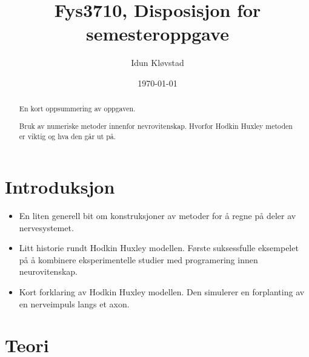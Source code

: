 \documentclass[a4paper,norsk,12pt,oneside]{article}
\title{Fys3710, Disposisjon for semesteroppgave}
\author{Idun Kløvstad}
\date{\today}
\begin{document}
\maketitle
\newpage 

\begin{abstract}
    En kort oppsummering av oppgaven. 

    Bruk av numeriske metoder innenfor nevrovitenskap. Hvorfor Hodkin Huxley metoden er viktig
    og hva den går ut på. 

\end{abstract}

\section*{Introduksjon} 

\begin{itemize}

    \item En liten generell bit om konstruksjoner av metoder for å regne på deler av nervesystemet. 

    \item Litt historie rundt Hodkin Huxley modellen. Første suksessfulle eksempelet på å kombinere eksperimentelle 
        studier med programering innen neurovitenskap. 

    \item Kort forklaring av Hodkin Huxley modellen. Den simulerer en forplanting av en nerveimpuls 
        langs et axon.

\end{itemize}

\section*{Teori}
\end{document}
